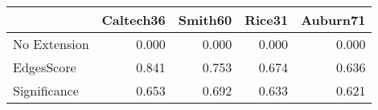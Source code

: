 \begin{tabular}{lrrrr}
\toprule
{} & Caltech36 & Smith60 & Rice31 & Auburn71 \\
\midrule
No Extension &     0.000 &   0.000 &  0.000 &    0.000 \\
EdgesScore   &     0.841 &   0.753 &  0.674 &    0.636 \\
Significance &     0.653 &   0.692 &  0.633 &    0.621 \\
\bottomrule
\end{tabular}
